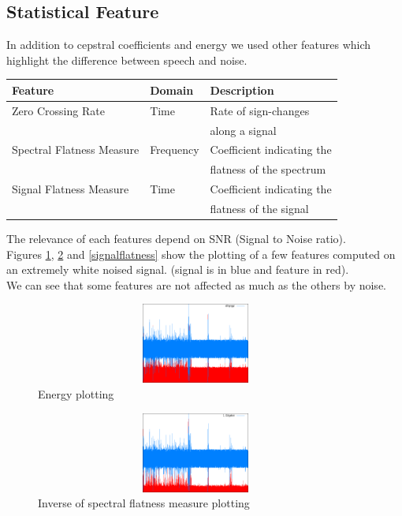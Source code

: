 \documentclass{techrep} %
\begin{document}
\subsection{Statistical Feature}
In addition to cepstral coefficients and energy we used other features
which highlight the difference between speech and noise.\\
\begin{center}
  \begin{tabular}{|l|l|l|}
    \hline Feature & Domain & Description\\ \hline Zero Crossing Rate
    & Time & Rate of sign-changes\\ &&along a signal\\ \hline Spectral
    Flatness Measure & Frequency & Coefficient indicating
    the\\ &&flatness of the spectrum\\ \hline Signal Flatness Measure
    & Time & Coefficient indicating the\\ &&flatness of the
    signal\\ \hline
  \end{tabular}
\end{center}
The relevance of each features depend on SNR (Signal to Noise
ratio).\\ Figures \ref{energyplot}, \ref{sfmplot} and
\ref{signalflatness} show the plotting of a few features computed on
an extremely white noised signal. (signal is in blue and feature in
red).\\ We can see that some features are not affected as much as the
others by noise.

\begin{figure}[H]
  \centering \includegraphics[width=400px, height=100px]{energy_plot}
  \caption{Energy plotting}
  \label{energyplot}
\end{figure}

\begin{figure}[H]
  \centering \includegraphics[width=400px, height=100px]{sfm_plot}
  \caption{Inverse of spectral flatness measure plotting}
  \label{sfmplot}
\end{figure}
\end{document}
